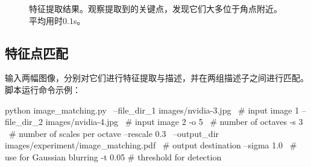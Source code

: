 \begin{figure}[H]
    \centering
    \caption{\sift 特征提取结果。观察提取到的关键点，发现它们大多位于角点附近。平均用时$0.1$s。}
\end{figure}

\subsection{特征点匹配}

输入两幅图像，分别对它们进行\sift 特征提取与描述，并在两组描述子之间进行匹配。脚本运行命令示例：
\begin{zshcode}
python image_matching.py \
       --file_dir_1 images/nvidia-3.jpg \ # input image 1
       --file_dir_2 images/nvidia-4.jpg \ # input image 2
       -o 5 \ # number of octaves
       -s 3 \ # number of scales per octave
       --rescale 0.3 \
       --output_dir images/experiment/image_matching.pdf \ # output destination
       --sigma 1.0 \ # use for Gaussian blurring
       -t 0.05 # threshold for detection
\end{zshcode}

